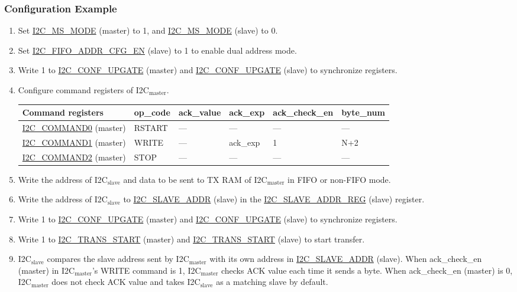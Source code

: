 \documentclass[main\_\_EN.tex]{subfiles}
\begin{document}
\subsubsection{Configuration Example}
\begin{enumerate}
\item Set \hyperref[fielddesc:I2CMSMODE]{I2C\_MS\_MODE} (master) to 1, and \hyperref[fielddesc:I2CMSMODE]{I2C\_MS\_MODE} (slave) to 0.
\item Set \hyperref[fielddesc:I2CFIFOADDRCFGEN]{I2C\_FIFO\_ADDR\_CFG\_EN} (slave) to 1 to enable dual address mode.
\item Write 1 to \hyperref[fielddesc:I2CCONFUPGATE]{I2C\_CONF\_UPGATE} (master) and \hyperref[fielddesc:I2CCONFUPGATE]{I2C\_CONF\_UPGATE} (slave) to synchronize registers.
\item Configure command registers of I2C$_\text{master}$.
\begin{longtable}{ | p{4.5cm} | p{1.8cm} | p{1.8cm} | p{1.8cm} |p{2.2cm} | p{1.8cm}|}
\hline\rowcolor{lightgray}
Command registers& op\_code & ack\_value&ack\_exp&ack\_check\_en&byte\_num  \\ \hline
\hyperref[fielddesc:I2CCOMMAND0]{I2C\_COMMAND0} (master)& RSTART& ---&---&---&---  \\ \hline
\hyperref[fielddesc:I2CCOMMAND1]{I2C\_COMMAND1} (master)& WRITE& ---&ack\_exp&1&N+2  \\ \hline
\hyperref[fielddesc:I2CCOMMAND2]{I2C\_COMMAND2} (master)& STOP& ---&---&---&---  \\ \hline
\end{longtable}
\item Write the address of I2C$_\text{slave}$ and data to be sent to TX RAM of I2C$_\text{master}$ in FIFO or non-FIFO mode.
\item Write the address of I2C$_\text{slave}$ to \hyperref[fielddesc:I2CSLAVEADDR]{I2C\_SLAVE\_ADDR} (slave) in the \hyperref[regdesc:I2CSLAVEADDRREG]{I2C\_SLAVE\_ADDR\_REG} (slave) register.
\item Write 1 to \hyperref[fielddesc:I2CCONFUPGATE]{I2C\_CONF\_UPGATE} (master) and \hyperref[fielddesc:I2CCONFUPGATE]{I2C\_CONF\_UPGATE} (slave) to synchronize registers.
\item Write 1 to \hyperref[fielddesc:I2CTRANSSTART]{I2C\_TRANS\_START} (master) and \hyperref[fielddesc:I2CTRANSSTART]{I2C\_TRANS\_START} (slave) to start transfer.
\item I2C$_\text{slave}$ compares the slave address sent by I2C$_\text{master}$ with its own address in \hyperref[fielddesc:I2CSLAVEADDR]{I2C\_SLAVE\_ADDR} (slave). When ack\_check\_en (master) in I2C$_\text{master}$'s WRITE command is 1, I2C$_\text{master}$ checks ACK value each time it sends a byte. When ack\_check\_en (master) is 0, I2C$_\text{master}$ does not check ACK value and takes I2C$_\text{slave}$ as a matching slave by default.

\end{enumerate}
\end{document}
